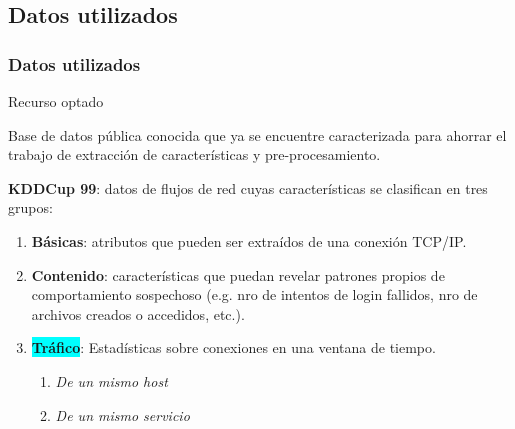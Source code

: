 \subsection{Datos utilizados}
\watermarkoff
\begin{frame}[t,fragile]
	\frametitle {Datos utilizados}

	\begin{block}{Recurso optado}
		
		Base de datos pública conocida que ya se encuentre caracterizada para ahorrar el trabajo de extracción de características y pre-procesamiento.

	\end{block}		
	
	\pause 
	\textbf{KDDCup 99}: datos de flujos de red cuyas características se clasifican en tres grupos:
		
	 \begin{enumerate}
	 		\pause
		 	\item \textbf{Básicas}: atributos que pueden ser extraídos de una conexión TCP/IP.
		 	
		 	\pause
		 	\item \textbf{Contenido}: características que puedan revelar patrones propios de comportamiento sospechoso (e.g. nro de intentos de login fallidos, nro de archivos creados o accedidos, etc.).
		 	
		 	\pause
		 	\item \colorbox{cyan}{\textbf{Tráfico}}: Estadísticas sobre conexiones en una ventana de tiempo.
		 	\begin{enumerate}
		 		\item \textit{De un mismo host} %
		 		
		 		\item \textit{De un mismo servicio} %
		 	\end{enumerate}
		 	
	 \end{enumerate}


\end{frame}
\watermarkon
\watermarkoff

